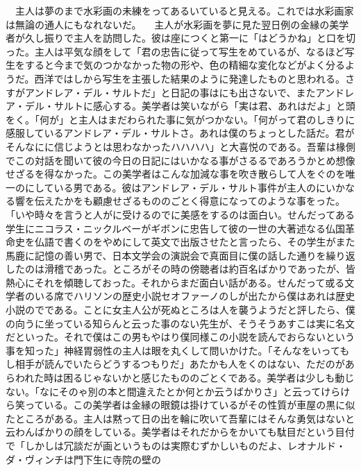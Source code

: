 \documentclass[a5j]{ltjtbook}
\begin{document}
　主人は夢のまで水彩画の未練をってあるいていると見える。これでは水彩画家は無論の通人にもなれないだ。 \newline
　主人が水彩画を夢に見た翌日例の金縁の美学者が久し振りで主人を訪問した。彼は座につくと第一に「はどうかね」と口を切った。主人は平気な顔をして「君の忠告に従って写生をめているが、なるほど写生をすると今まで気のつかなかった物の形や、色の精細な変化などがよく分るようだ。西洋ではしから写生を主張した結果のように発達したものと思われる。さすがアンドレア・デル・サルトだ」と日記の事はにも出さないで、またアンドレア・デル・サルトに感心する。美学者は笑いながら「実は君、あれはだよ」と頭をく。「何が」と主人はまだわられた事に気がつかない。「何がって君のしきりに感服しているアンドレア・デル・サルトさ。あれは僕のちょっとした話だ。君がそんなにに信じようとは思わなかったハハハハ」と大喜悦のである。吾輩は椽側でこの対話を聞いて彼の今日の日記にはいかなる事がさるるであろうかとめ想像せざるを得なかった。この美学者はこんな加減な事を吹き散らして人をぐのを唯一のにしている男である。彼はアンドレア・デル・サルト事件が主人のにいかなる響を伝えたかをも顧慮せざるもののごとく得意になってのような事をった。「いや時々を言うと人がに受けるのでに美感をするのは面白い。せんだってある学生にニコラス・ニックルベーがギボンに忠告して彼の一世の大著述なる仏国革命史を仏語で書くのをやめにして英文で出版させたと言ったら、その学生がまた馬鹿に記憶の善い男で、日本文学会の演説会で真面目に僕の話した通りを繰り返したのは滑稽であった。ところがその時の傍聴者は約百名ばかりであったが、皆熱心にそれを傾聴しておった。それからまだ面白い話がある。せんだって或る文学者のいる席でハリソンの歴史小説セオファーノのしが出たから僕はあれは歴史小説のでである。ことに女主人公が死ぬところは人を襲うようだと評したら、僕の向うに坐っている知らんと云った事のない先生が、そうそうあすこは実に名文だといった。それで僕はこの男もやはり僕同様この小説を読んでおらないという事を知った」神経胃弱性の主人は眼を丸くして問いかけた。「そんなをいってもし相手が読んでいたらどうするつもりだ」あたかも人をくのはない、ただのがあらわれた時は困るじゃないかと感じたもののごとくである。美学者は少しも動じない。「なにそのゃ別の本と間違えたとか何とか云うばかりさ」と云ってけらけら笑っている。この美学者は金縁の眼鏡は掛けているがその性質が車屋の黒に似たところがある。主人は黙って日の出を輪に吹いて吾輩にはそんな勇気はないと云わんばかりの顔をしている。美学者はそれだからをかいても駄目だという目付で「しかしは冗談だが画というものは実際むずかしいものだよ、レオナルド・ダ・ヴィンチは門下生に寺院の壁の
\end{document}
